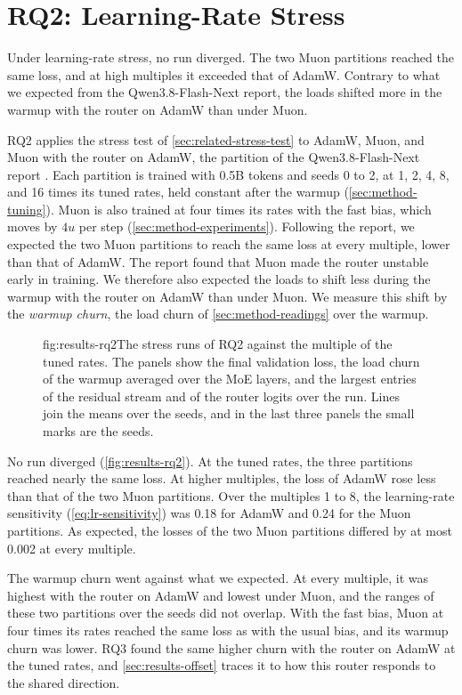 \section{RQ2: Learning-Rate Stress}
\label{sec:results-rq2}
Under learning-rate stress, no run diverged. The two Muon partitions reached the same loss, and at high multiples it exceeded that of AdamW\@. Contrary to what we expected from the Qwen3.8-Flash-Next report, the loads shifted more in the warmup with the router on AdamW than under Muon.

RQ2 applies the stress test of \cref{sec:related-stress-test} to AdamW, Muon, and Muon with the router on AdamW, the partition of the Qwen3.8-Flash-Next report \cite{qiu2026qwennext}. Each partition is trained with 0.5B tokens and seeds 0 to 2, at 1, 2, 4, 8, and 16 times its tuned rates, held constant after the warmup (\cref{sec:method-tuning}). Muon is also trained at four times its rates with the fast bias, which moves by $4u$ per step (\cref{sec:method-experiments}). Following the report, we expected the two Muon partitions to reach the same loss at every multiple, lower than that of AdamW\@. The report found that Muon made the router unstable early in training. We therefore also expected the loads to shift less during the warmup with the router on AdamW than under Muon. We measure this shift by the \emph{warmup churn}, the load churn of \cref{sec:method-readings} over the warmup.

\begin{figure}[The stress runs of RQ2]{fig:results-rq2}{The stress runs of RQ2 against the multiple of the tuned rates. The panels show the final validation loss, the load churn of the warmup averaged over the MoE layers, and the largest entries of the residual stream and of the router logits over the run. Lines join the means over the seeds, and in the last three panels the small marks are the seeds.}
  
\end{figure}

No run diverged (\cref{fig:results-rq2}). At the tuned rates, the three partitions reached nearly the same loss. At higher multiples, the loss of AdamW rose less than that of the two Muon partitions. Over the multiples 1 to 8, the learning-rate sensitivity (\cref{eq:lr-sensitivity}) was 0.18 for AdamW and 0.24 for the Muon partitions. As expected, the losses of the two Muon partitions differed by at most 0.002 at every multiple.

The warmup churn went against what we expected. At every multiple, it was highest with the router on AdamW and lowest under Muon, and the ranges of these two partitions over the seeds did not overlap. With the fast bias, Muon at four times its rates reached the same loss as with the usual bias, and its warmup churn was lower. RQ3 found the same higher churn with the router on AdamW at the tuned rates, and \cref{sec:results-offset} traces it to how this router responds to the shared direction.

